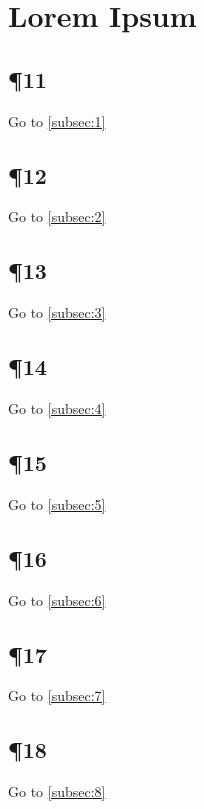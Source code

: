 \documentclass[twoside]{article}
\begin{document}
\section{Lorem Ipsum}
\subsection{\P 11}\label{subsec:11}\lipsum[11] Go to \ref{subsec:1}
\subsection{\P 12}\label{subsec:12}\lipsum[12] Go to \ref{subsec:2}
\subsection{\P 13}\label{subsec:13}\lipsum[13] Go to \ref{subsec:3}
\subsection{\P 14}\label{subsec:14}\lipsum[14] Go to \ref{subsec:4}
\subsection{\P 15}\label{subsec:15}\lipsum[15] Go to \ref{subsec:5}
\subsection{\P 16}\label{subsec:16}\lipsum[16] Go to \ref{subsec:6}
\subsection{\P 17}\label{subsec:17}\lipsum[17] Go to \ref{subsec:7}
\subsection{\P 18}\label{subsec:18}\lipsum[18] Go to \ref{subsec:8}
\end{document}

